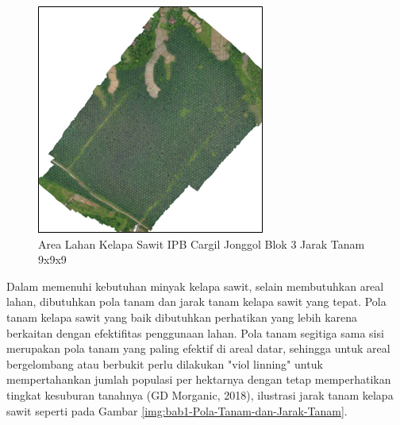 \begin{figure}[H]
	\vspace{-0.1cm}
	\begin{center}
		\includegraphics[width=0.5\columnwidth]{bab1/Gambar/Picture1.png}
	\end{center}
	\vspace{-0.2cm}
	\caption{Area Lahan Kelapa Sawit IPB Cargil Jonggol Blok 3 Jarak Tanam 9x9x9}\label{img:bab1-area-lahan-IPB}
\end{figure}

Dalam memenuhi kebutuhan minyak kelapa sawit, selain membutuhkan areal lahan, dibutuhkan pola tanam dan jarak tanam kelapa sawit yang tepat. Pola tanam kelapa sawit yang baik dibutuhkan perhatikan yang lebih karena berkaitan dengan efektifitas penggunaan lahan. Pola tanam segitiga sama sisi merupakan pola tanam yang paling efektif di areal datar, sehingga untuk areal bergelombang atau berbukit perlu dilakukan "viol linning" untuk mempertahankan jumlah populasi per hektarnya dengan tetap memperhatikan tingkat kesuburan tanahnya (GD Morganic, 2018), ilustrasi jarak tanam kelapa sawit seperti pada Gambar \ref{img:bab1-Pola-Tanam-dan-Jarak-Tanam}.

